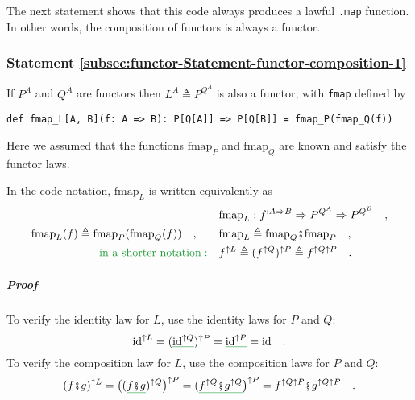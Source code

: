 The next statement shows that this code always produces a lawful \lstinline!.map!
function. In other words, the composition
of functors is always a functor.

\subsubsection{Statement \label{subsec:functor-Statement-functor-composition-1}\ref{subsec:functor-Statement-functor-composition-1}}

If $P^{A}$ and $Q^{A}$ are functors then $L^{A}\triangleq P^{Q^{A}}$
is also a functor, with \lstinline!fmap! defined by
\begin{lstlisting}
def fmap_L[A, B](f: A => B): P[Q[A]] => P[Q[B]] = fmap_P(fmap_Q(f))
\end{lstlisting}
Here we assumed that the functions $\text{fmap}_{P}$ and $\text{fmap}_{Q}$
are known and satisfy the functor laws.

In the code notation, $\text{fmap}_{L}$ is written equivalently as
\begin{align}
 & \text{fmap}_{L}:f^{:A\Rightarrow B}\Rightarrow P^{Q^{A}}\Rightarrow P^{Q^{B}}\quad,\nonumber \\
\text{fmap}_{L}(f)\triangleq\text{fmap}_{P}(\text{fmap}_{Q}(f))\quad,\quad\quad & \text{fmap}_{L}\triangleq\text{fmap}_{Q}\bef\text{fmap}_{P}\quad,\nonumber \\
{\color{greenunder}\text{in a shorter notation}:}\quad & f^{\uparrow L}\triangleq(f^{\uparrow Q})^{\uparrow P}\triangleq f^{\uparrow Q\uparrow P}\quad.\label{eq:def-functor-composition-fmap}
\end{align}


\subparagraph{Proof}

To verify the identity law for $L$, use the identity laws for $P$
and $Q$:
\[
\text{id}^{\uparrow L}=(\gunderline{\text{id}^{\uparrow Q}})^{\uparrow P}=\gunderline{\text{id}^{\uparrow P}}=\text{id}\quad.
\]
To verify the composition law for $L$, use the composition laws for
$P$ and $Q$:
\[
(f\bef g)^{\uparrow L}=\big((\gunderline{f\bef g})^{\uparrow Q}\big)^{\uparrow P}=(\gunderline{f^{\uparrow Q}\bef g^{\uparrow Q}}\big)^{\uparrow P}=f^{\uparrow Q\uparrow P}\bef g^{\uparrow Q\uparrow P}\quad.
\]

